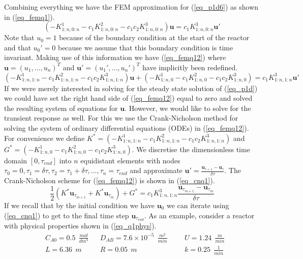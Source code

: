 \documentclass[11pt,fleqn]{article}
\theoremstyle{defstyle}
\begin{document}
Combining everything we have the FEM approximation for (\ref{eq_p1d6}) as shown in (\ref{eq_femq1}). 
\begin{equation}
\left(-K^1_{1:n,0:n}-c_1K^2_{1:n,0:n}-c_1c_2K^3_{1:n,0:n} \right)\mathbf{u} =  c_1K^3_{1:n,0:n}\mathbf{u}\prime
\label{eq_femq1}
\end{equation}
Note that $u_0=1$ because of the boundary condition at the start of the reactor and that $u_0\prime=0$ because we assume that this boundary condition is time invariant. Making use of this information we have (\ref{eq_femq12}) where $\mathbf{u}=\left(u_1,...,u_n\right)^T$ and $\mathbf{u}\prime=\left(u_1\prime,...,u_n\prime \right)^T$ have implicitly been redefined.
\begin{equation}
\left(-K^1_{1:n,1:n}-c_1K^2_{1:n,1:n}-c_1c_2K^3_{1:n,1:n} \right)\mathbf{u} +\left(-K^1_{1:n,0}-c_1K^2_{1:n,0} -c_1c_2K^3_{1:n,0}\right) =  c_1K^3_{1:n,1:n}\mathbf{u}\prime
\label{eq_femq12}
\end{equation}
If we were merely interested in solving for the steady state solution of (\ref{eq_p1d}) we could have set the right hand side of (\ref{eq_femq12}) equal to zero and solved the resulting system of equations for $\mathbf{u}$. However, we would like to solve for the transient response as well. For this we use the Crank-Nicholson method for solving the system of ordinary differential equations (ODEs) in (\ref{eq_femq12}). For convenience we define $K^* = \left(-K^1_{1:n,1:n}-c_1K^2_{1:n,1:n}-c_1c_2K^3_{1:n,1:n} \right)$ and $G^{*} = \left(-K^1_{1:n,0}-c_1K^2_{1:n,0} -c_1c_2K^3_{1:n,0}\right)$. We discretise the dimensionless time domain $[0,\tau_{end}]$ into $n$ equidistant elements with nodes $\tau_0 = 0, \tau_1=\delta \tau, \tau_2=\tau_1 + \delta \tau,...,\tau_n=\tau_{end}$ and approximate $\mathbf{u}\prime = \frac{\mathbf{u}_{\tau+1} -\mathbf{u}_{\tau}}{\delta \tau}$. The Crank-Nicholson scheme for (\ref{eq_femq12}) is shown in (\ref{eq_cnq1}).
\begin{equation}
\frac{1}{2}\left( K^*\mathbf{u}_{\tau_{m+1}} + K^*\mathbf{u}_{\tau_m} \right) + G^* = c_1K^3_{1:n,1:n}\frac{\mathbf{u}_{\tau_{m+1}} -\mathbf{u}_{\tau_{m}}}{\delta \tau}
\label{eq_cnq1}
\end{equation} 
If we recall that by the initial condition we have $\mathbf{u}_0$ we can iterate using (\ref{eq_cnq1}) to get to the final time step $\mathbf{u}_{\tau_{end}}$. As an example, consider a reactor with physical properties shown in (\ref{eq_q1phys}).
\begin{equation}
\begin{aligned}
&C_{A0} = 0.5~~ \frac{mol}{dm^3}
&&D_{AB} = 7.6\times 10^{-5} ~~\frac{m^2}{min}
&&&U = 1.24~~ \frac{m}{min} \\
&L = 6.36~~ m 
&&R = 0.05~~ m
&&&k = 0.25~~ \frac{1}{min} 
\end{aligned}
\label{eq_q1phys}
\end{equation}
\end{document}
